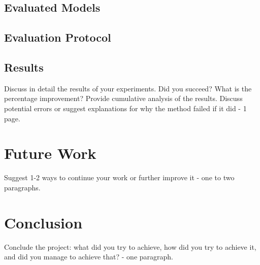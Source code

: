 \documentclass{acmart}
\begin{document}
\subsection{Evaluated Models}

\subsection{Evaluation Protocol}

\subsection{Results}
Discuss in detail the results of your experiments. Did you succeed? What is the percentage improvement? Provide cumulative analysis of the results. Discuss potential errors or suggest explanations for why the method failed if it did - 1 page.

\section{Future Work}
Suggest 1-2 ways to continue your work or further improve it - one to two paragraphs.

\section{Conclusion}
Conclude the project: what did you try to achieve, how did you try to achieve it, and did you manage to achieve that? - one paragraph.



\end{document}

